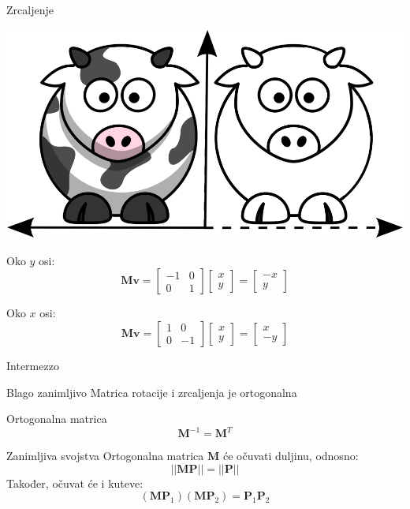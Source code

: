 \documentclass[9pt]{beamer}
\begin{document}
\begin{frame}{Zrcaljenje}
	\begin{center}
		\includegraphics[height=1.cm]{slike/funny_cow_mirror.png}
	\end{center}
	Oko $y$ osi:
	\begin{equation}
	\mathbf{M}\mathbf{v} = \left[ \begin{array}{cc} -1 & 0 \\ 
	0 & 1  \end{array} \right] 
	\left[ \begin{array}{c} x \\ y  \end{array} \right] = 
	\left[ \begin{array}{c} -x  \\ 
	y  \end{array} \right]
	\nonumber
	\end{equation}
	
	Oko $x$ osi:
	\begin{equation}
	\mathbf{M}\mathbf{v} = \left[ \begin{array}{cc} 1 & 0 \\ 
	0 & -1  \end{array} \right] 
	\left[ \begin{array}{c} x \\ y  \end{array} \right] = 
	\left[ \begin{array}{c} x  \\ 
	-y  \end{array} \right]
	\nonumber
	\end{equation}
	
\end{frame}

\begin{frame}{Intermezzo}
	\begin{block}{Blago zanimljivo}
		Matrica rotacije i zrcaljenja je ortogonalna 
	\end{block}
	\begin{block}{Ortogonalna matrica}
		$$\mathbf{M}^{-1} = \mathbf{M}^T$$
	\end{block}
	\begin{block}{Zanimljiva svojstva}
		Ortogonalna matrica $\mathbf{M}$ će očuvati duljinu, odnosno:
		$$||\mathbf{M}\mathbf{P}|| = ||\mathbf{P}||$$
		Također, očuvat će i kuteve:
		$$(\mathbf{M}\mathbf{P}_1) (\mathbf{M}\mathbf{P}_2)= \mathbf{P}_1\mathbf{P}_2$$
	\end{block}
\end{frame}
\end{document}
